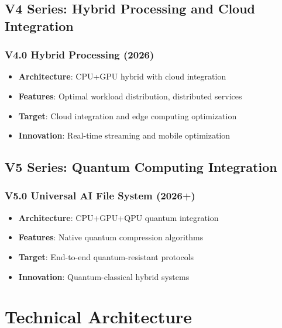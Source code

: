 \documentclass[12pt,a4paper]{article}
\begin{document}
\subsection{V4 Series: Hybrid Processing and Cloud Integration}
\subsubsection{V4.0 Hybrid Processing (2026)}
\begin{itemize}
    \item \textbf{Architecture}: CPU+GPU hybrid with cloud integration
    \item \textbf{Features}: Optimal workload distribution, distributed services
    \item \textbf{Target}: Cloud integration and edge computing optimization
    \item \textbf{Innovation}: Real-time streaming and mobile optimization
\end{itemize}

\subsection{V5 Series: Quantum Computing Integration}
\subsubsection{V5.0 Universal AI File System (2026+)}
\begin{itemize}
    \item \textbf{Architecture}: CPU+GPU+QPU quantum integration
    \item \textbf{Features}: Native quantum compression algorithms
    \item \textbf{Target}: End-to-end quantum-resistant protocols
    \item \textbf{Innovation}: Quantum-classical hybrid systems
\end{itemize}

\newpage

\section{Technical Architecture}
\end{document}
